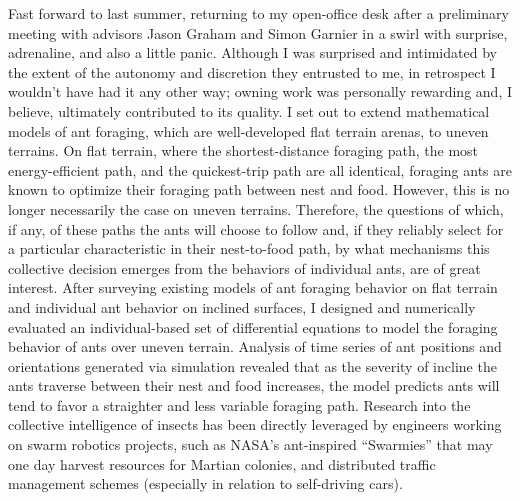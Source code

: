 \documentclass[12pt]{book}
\begin{document}
Fast forward to last summer, returning to my open-office desk after a preliminary meeting with advisors Jason Graham and Simon Garnier in a swirl with surprise, adrenaline, and also a little panic. Although I was surprised and intimidated by the extent of the autonomy and discretion they entrusted to me, in retrospect I wouldn't have had it any other way; owning work was personally rewarding and, I believe, ultimately contributed to its quality. I set out to extend mathematical models of ant foraging, which are well-developed flat terrain arenas, to uneven terrains. On flat terrain, where the shortest-distance foraging path, the most energy-efficient path, and the quickest-trip path are all identical, foraging ants are known to optimize their foraging path between nest and food.
However, this is no longer necessarily the case on uneven terrains. Therefore, the questions of which, if any, of these paths the ants will choose to follow and, if they reliably select for a particular characteristic in their nest-to-food path, by what mechanisms this collective decision emerges from the behaviors of individual ants, are of great interest. After surveying existing models of ant foraging behavior on flat terrain and individual ant behavior on inclined surfaces, I designed and numerically evaluated an individual-based set of differential equations to model the foraging behavior of ants over uneven terrain. Analysis of time series of ant positions and orientations generated via simulation revealed that as the severity of incline the ants traverse between their nest and food increases, the model predicts ants will tend to favor a straighter and less variable foraging path. Research into the collective intelligence of insects has been directly leveraged by engineers working on swarm robotics projects, such as NASA's ant-inspired ``Swarmies'' that may one day harvest resources for Martian colonies, and distributed traffic management schemes (especially in relation to self-driving cars).
\end{document}
